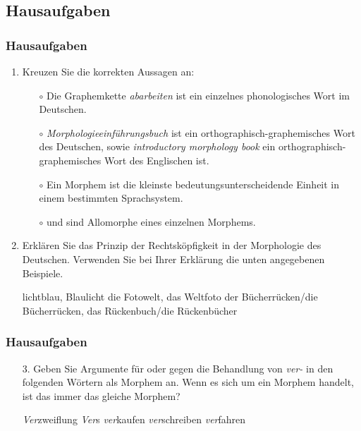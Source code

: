 
\subsection{Hausaufgaben}

\begin{frame}
	\frametitle{Hausaufgaben}

	
\begin{enumerate}
	 \item Kreuzen Sie die korrekten Aussagen an: %

\begin{itemize}
	\item[$\circ$] Die Graphemkette \emph{abarbeiten} ist ein einzelnes phonologisches Wort im Deutschen.
	\item[$\circ$] \emph{Morphologieeinführungsbuch} ist ein orthographisch-graphemisches Wort des Deutschen, sowie \emph{introductory morphology book} ein orthographisch-graphemisches Wort des Englischen ist.
	\item[$\circ$] Ein Morphem ist die kleinste bedeutungsunterscheidende Einheit in einem bestimmten Sprachsystem.
	\item[$\circ$]  und  sind Allomorphe eines einzelnen Morphems.
\end{itemize}

	\item Erklären Sie das Prinzip der Rechtsköpfigkeit in der Morphologie des Deutschen. Verwenden Sie bei Ihrer Erklärung die unten angegebenen Beispiele.%

\eal
\ex lichtblau, Blaulicht
\ex die Fotowelt, das Weltfoto
\ex der Bücherrücken/die Bücherrücken, das Rückenbuch/die Rückenbücher
\zl
\end{enumerate}

\end{frame}



\begin{frame}
\frametitle{Hausaufgaben}
\begin{itemize}
	\item[3.] Geben Sie Argumente für oder gegen die Behandlung von \emph{ver-} in den folgenden Wörtern als Morphem an. Wenn es sich um ein Morphem handelt, ist das immer das gleiche Morphem? %

	\eal
	\ex \emph{Ver}zweiflung
	\ex \emph{Ver}s
	\ex \emph{ver}kaufen
	\ex \emph{ver}schreiben
	\ex \emph{ver}fahren
	\zl

\end{itemize}
\end{frame}



